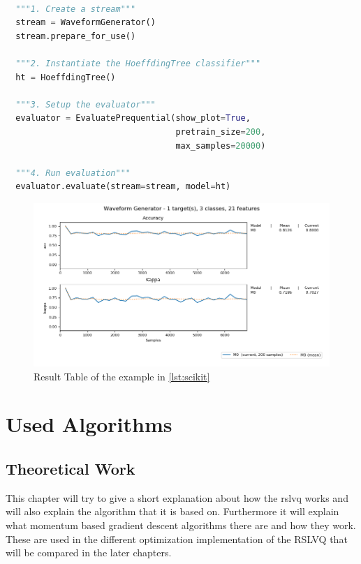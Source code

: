 \documentclass[12pt,oneside,a4paper,parskip]{scrbook}
\begin{document}
\pagebreak

\begin{lstlisting}[label=lst:scikit,
  language=python,
  firstnumber=1,
  caption=Simple example of the scikit-multiflow workflow]			   

  """1. Create a stream""" 
  stream = WaveformGenerator()
  stream.prepare_for_use()
  
  """2. Instantiate the HoeffdingTree classifier"""
  ht = HoeffdingTree()
  
  """3. Setup the evaluator"""
  evaluator = EvaluatePrequential(show_plot=True,
                                  pretrain_size=200,
                                  max_samples=20000)
  
  """4. Run evaluation"""
  evaluator.evaluate(stream=stream, model=ht)
\end{lstlisting}

\begin{figure}[H]
  \centering
  \includegraphics[width=\columnwidth]{Scikit_multiflow_example}
  \caption{Result Table of the example in \ref{lst:scikit}} 
  \label{fig:sci_result_examp}
\end{figure}

\chapter{Used Algorithms}

\section{Theoretical Work}

This chapter will try to give a short explanation about how the \ac{rslvq} works and will also explain the algorithm that it is based on. 
Furthermore it will explain what momentum based gradient descent algorithms there are and how they work.
These are used in the different optimization implementation of the RSLVQ that will be compared in the later chapters. 
\end{document}

